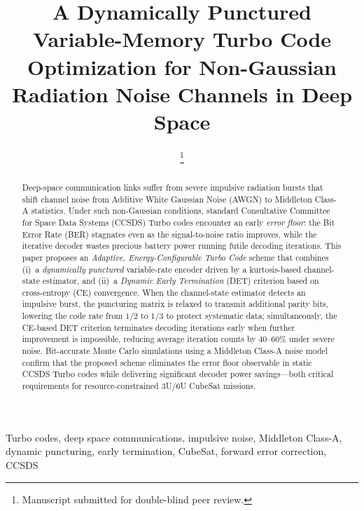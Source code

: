\documentclass[journal,twocolumn]{IEEEtran}
\newcommand{\detabb}{\textsf{DET}}
\begin{document}
\title{A Dynamically Punctured Variable-Memory Turbo Code Optimization
       for Non-Gaussian Radiation Noise Channels in Deep Space}

\author{%
  \thanks{Manuscript submitted for double-blind peer review.}
}

\maketitle

\begin{abstract}
Deep-space communication links suffer from severe impulsive radiation
bursts that shift channel noise from Additive White Gaussian Noise
(AWGN) to Middleton Class-A statistics.  Under such non-Gaussian
conditions, standard Consultative Committee for Space Data Systems
(CCSDS) Turbo codes encounter an early \emph{error floor}: the Bit
Error Rate (BER) stagnates even as the signal-to-noise ratio improves,
while the iterative decoder wastes precious battery power running
futile decoding iterations.  This paper proposes an
\emph{Adaptive, Energy-Configurable Turbo Code} scheme that
combines (i)~a \emph{dynamically punctured} variable-rate encoder
driven by a kurtosis-based channel-state estimator, and (ii)~a
\emph{Dynamic Early Termination} (\detabb{}) criterion based on
cross-entropy (CE) convergence.  When the channel-state estimator
detects an impulsive burst, the puncturing matrix is relaxed to
transmit additional parity bits, lowering the code rate from $1/2$ to
$1/3$ to protect systematic data; simultaneously, the CE-based \detabb{}
criterion terminates decoding iterations early when further
improvement is impossible, reducing average iteration counts by
40--60\% under severe noise.  Bit-accurate Monte Carlo simulations
using a Middleton Class-A noise model confirm that the proposed scheme
eliminates the error floor observable in static CCSDS Turbo codes
while delivering significant decoder power savings---both critical
requirements for resource-constrained 3U/6U CubeSat missions.
\end{abstract}

\begin{IEEEkeywords}
Turbo codes, deep space communications, impulsive noise, Middleton
Class-A, dynamic puncturing, early termination, CubeSat, forward
error correction, CCSDS
\end{IEEEkeywords}

\end{document}
